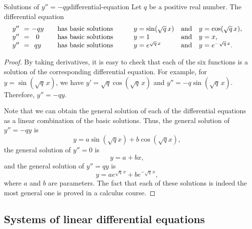 \begin{theorem}{Solutions of $y''=-qy$}{differential-equation}
  Let $q$ be a positive real number.  The differential equation
  \begin{equation*}
    \begin{array}{l@{~~}l@{~}clllll}
    y'' &=& -qy &\quad\mbox{has basic solutions}\quad\quad &
    y = \sin(\sqrt{q}\,x) & \mbox{and} & y = \cos(\sqrt{q}\,x),\\
    y'' &=& 0 &\quad\mbox{has basic solutions}\quad\quad &
    y = 1 & \mbox{and} & y = x, \\
    y'' &=& qy &\quad\mbox{has basic solutions}\quad\quad &
    y = e^{\sqrt{q}\,x} & \mbox{and} & y = e^{-\sqrt{q}\,x}. \\
    \end{array}
  \end{equation*}
\end{theorem}

\begin{proof}
  By taking derivatives, it is easy to check that each of the six
  functions is a solution of the corresponding differential
  equation. For example, for $y=\sin(\sqrt{q}\,x)$, we have
  $y'=\sqrt{q}\cos(\sqrt{q}\,x)$ and
  $y''=-q\sin(\sqrt{q}\,x)$. Therefore, $y''=-qy$.

  Note that we can obtain the general solution of each of the
  differential equations as a linear combination of the basic
  solutions. Thus, the general solution of $y''=-qy$ is
  \begin{equation*}
      y = a\sin(\sqrt{q}x) + b\cos(\sqrt{q}x),
  \end{equation*}
  the general solution of $y''=0$ is
  \begin{equation*}
      y = a + bx,
  \end{equation*}
  and the general solution of $y''=qy$ is
  \begin{equation*}
      y = ae^{\sqrt{q}\,x} + be^{-\sqrt{q}\,x},
  \end{equation*}
  where $a$ and $b$ are parameters. The fact that each of these
  solutions is indeed the most general one is proved in a calculus
  course.
\end{proof}

\subsection{Systems of linear differential equations}

